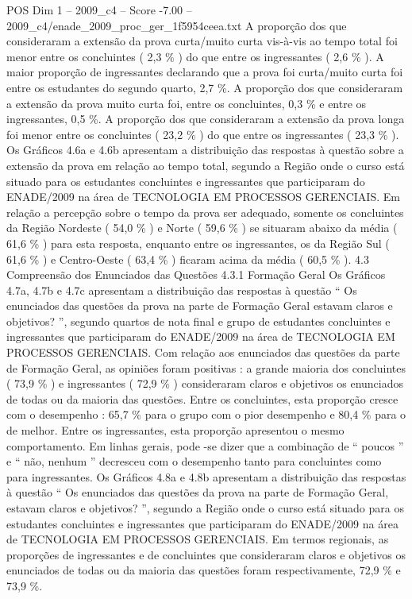 \begin{textsample}{POS Dim 1 – 2009\_c4 – Score -7.00 – 2009\_c4/enade\_2009\_proc\_ger\_1f5954ceea.txt}
A proporção dos que consideraram a extensão da prova curta/muito curta vis-à-vis ao tempo total foi menor entre os concluintes ( 2,3 \% ) do que entre os ingressantes ( 2,6 \% ).
A maior proporção de ingressantes declarando que a prova foi curta/muito curta foi entre os estudantes do segundo quarto, 2,7 \%.
A proporção dos que consideraram a extensão da prova muito curta foi, entre os concluintes, 0,3 \% e entre os ingressantes, 0,5 \%.
A proporção dos que consideraram a extensão da prova longa foi menor entre os concluintes ( 23,2 \% ) do que entre os ingressantes ( 23,3 \% ).
Os Gráficos 4.6a e 4.6b apresentam a distribuição das respostas à questão sobre a extensão da prova em relação ao tempo total, segundo a Região onde o curso está situado para os estudantes concluintes e ingressantes que participaram do ENADE/2009 na área de TECNOLOGIA EM PROCESSOS GERENCIAIS.
Em relação a percepção sobre o tempo da prova ser adequado, somente os concluintes da Região Nordeste ( 54,0 \% ) e Norte ( 59,6 \% ) se situaram abaixo da média ( 61,6 \% ) para esta resposta, enquanto entre os ingressantes, os da Região Sul ( 61,6 \% ) e Centro-Oeste ( 63,4 \% ) ficaram acima da média ( 60,5 \% ). 4.3 Compreensão dos Enunciados das Questões 4.3.1 Formação Geral Os Gráficos 4.7a, 4.7b e 4.7c apresentam a distribuição das respostas à questão “ Os enunciados das questões da prova na parte de Formação Geral estavam claros e objetivos? ”, segundo quartos de nota final e grupo de estudantes concluintes e ingressantes que participaram do ENADE/2009 na área de TECNOLOGIA EM PROCESSOS GERENCIAIS.
Com relação aos enunciados das questões da parte de Formação Geral, as opiniões foram positivas : a grande maioria dos concluintes ( 73,9 \% ) e ingressantes ( 72,9 \% ) consideraram claros e objetivos os enunciados de todas ou da maioria das questões.
Entre os concluintes, esta proporção cresce com o desempenho : 65,7 \% para o grupo com o pior desempenho e 80,4 \% para o de melhor.
Entre os ingressantes, esta proporção apresentou o mesmo comportamento.
Em linhas gerais, pode -se dizer que a combinação de “ poucos ” e “ não, nenhum ” decresceu com o desempenho tanto para concluintes como para ingressantes.
Os Gráficos 4.8a e 4.8b apresentam a distribuição das respostas à questão “ Os enunciados das questões da prova na parte de Formação Geral, estavam claros e objetivos? ”, segundo a Região onde o curso está situado para os estudantes concluintes e ingressantes que participaram do ENADE/2009 na área de TECNOLOGIA EM PROCESSOS GERENCIAIS.
Em termos regionais, as proporções de ingressantes e de concluintes que consideraram claros e objetivos os enunciados de todas ou da maioria das questões foram respectivamente, 72,9 \% e 73,9 \%.

\end{textsample}
